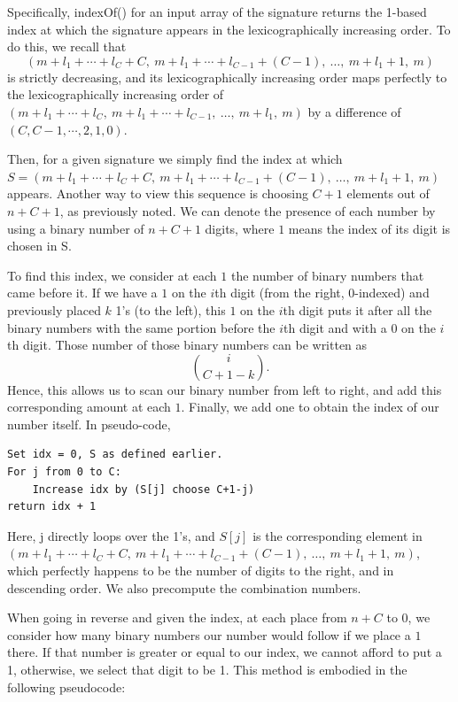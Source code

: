\documentclass[a4paper,10pt,english]{scrartcl}
\begin{document}
Specifically, indexOf() for an input array of the signature returns the 1-based index at which the signature appears in the lexicographically increasing order. To do this, we recall that $$(m+l_1+\cdots+l_C+C,\ m+l_1+\cdots+l_{C-1}+(C-1),\ \ldots,\ m+l_1+1,\ m)$$ is strictly decreasing, and its lexicographically increasing order maps perfectly to the lexicographically increasing order of $(m+l_1+\cdots+l_C,\ m+l_1+\cdots+l_{C-1},\ \ldots,\ m+l_1,\ m)$ by a difference of $(C, C-1, \cdots, 2, 1, 0)$. 

Then, for a given signature we simply find the index at which $S = (m+l_1+\cdots+l_C+C,\ m+l_1+\cdots+l_{C-1}+(C-1),\ \ldots,\ m+l_1+1,\ m)$ appears. Another way to view this sequence is choosing $C+1$ elements out of $n+C+1$, as previously noted. We can denote the presence of each number by using a binary number of $n+C+1$ digits, where $1$ means the index of its digit is chosen in S. 

To find this index, we consider at each $1$ the number of binary numbers that came before it. If we have a $1$ on the $i$th digit (from the right, 0-indexed) and previously placed $k$ 1's (to the left), this $1$ on the $i$th digit puts it after all the binary numbers with the same portion before the $i$th digit and with a $0$ on the $i$th digit. Those number of those binary numbers can be written as $$\binom{i}{C+1-k}.$$ Hence, this allows us to scan our binary number from left to right, and add this corresponding amount at each $1$. Finally, we add one to obtain the index of our number itself. In pseudo-code,

\begin{verbatim}
Set idx = 0, S as defined earlier.
For j from 0 to C:
    Increase idx by (S[j] choose C+1-j)
return idx + 1
\end{verbatim}

Here, j directly loops over the 1's, and $S[j]$ is the corresponding element in $(m+l_1+\cdots+l_C+C,\ m+l_1+\cdots+l_{C-1}+(C-1),\ \ldots,\ m+l_1+1,\ m)$, which perfectly happens to be the number of digits to the right, and in descending order. We also precompute the combination numbers.

When going in reverse and given the index, at each place from $n+C$ to 0, we consider how many binary numbers our number would follow if we place a $1$ there. If that number is greater or equal to our index, we cannot afford to put a 1, otherwise, we select that digit to be 1. This method is embodied in the following pseudocode:
\end{document}
